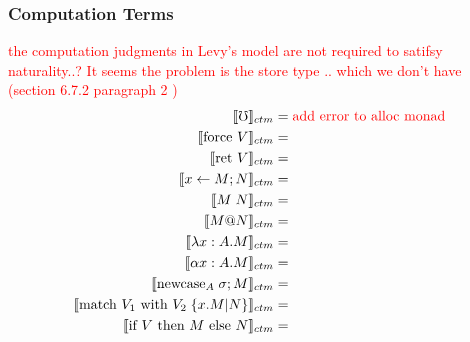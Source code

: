 \documentclass{article}
\makeatletter
\newcommand{\red}[1]{\textcolor{red}{#1}}
\newcommand{\err}{\mho}
\newcommand{\force}[1]{\textrm{force }#1}
\newcommand{\ret}[1]{\textrm{ret }#1}
\newcommand{\bind}[3]{#1 \leftarrow #2 ; #3}
\newcommand{\newcase}[3]{\textrm{newcase}_{#1} \; #2 ; #3}
\newcommand{\match}[5]{\textrm{match }#1 \textrm{ with }#2 \;\{#3 . #4 | #5\}}
\newcommand{\ite}[3]{\textrm{if }#1 \textrm{ then }#2 \textrm{ else }#3}
\newcommand{\at}{\textrm{@}}
\makeatother
\begin{document}
\subsubsection{Computation Terms}
\red{the computation judgments in Levy's model are not required to satifsy naturality..? It seems the problem is the store type
.. which we don't have (section 6.7.2 paragraph 2 \cite{CBPV-Book})}
\begin{align*}
    \llbracket \err \rrbracket_{ctm} &= \red{\textrm{add error to alloc monad}}\\
    \llbracket \force{V} \rrbracket_{ctm} &= \\
    \llbracket \ret{V} \rrbracket_{ctm} &= \\
    \llbracket \bind{x}{M}{N} \rrbracket_{ctm} &= \\
    \llbracket M \; N \rrbracket_{ctm} &= \\
    \llbracket M \at N \rrbracket_{ctm} &= \\
    \llbracket \lambda x : A . M \rrbracket_{ctm} &=  \\
    \llbracket \alpha x : A . M \rrbracket_{ctm} &= \\
    \llbracket \newcase{A}{\sigma}{M} \rrbracket_{ctm} &= \\
    \llbracket \match{V_1}{V_2}{x}{M}{N}\rrbracket_{ctm} &= \\
    \llbracket \ite{V}{M}{N} \rrbracket_{ctm} &= \\
\end{align*}




\end{document}
